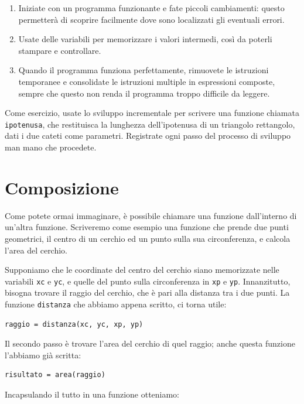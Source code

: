 \documentclass[10pt]{book}
\begin{document}
\begin{enumerate}

\item Iniziate con un programma funzionante e fate piccoli cambiamenti:
       questo permetterà di scoprire facilmente dove sono localizzati
       gli eventuali errori.

\item Usate delle variabili per memorizzare i valori intermedi, così
       da poterli stampare e controllare.

\item Quando il programma funziona perfettamente, rimuovete le istruzioni        temporanee e consolidate le istruzioni multiple in espressioni composte, sempre che questo non renda il programma troppo difficile da leggere.

\end{enumerate}


Come esercizio, usate lo sviluppo incrementale per scrivere una funzione
chiamata {\tt ipotenusa}, che restituisca la lunghezza dell'ipotenusa di un
triangolo rettangolo, dati i due cateti come parametri.
Registrate ogni passo del processo di sviluppo man mano che procedete.

\section{Composizione}

Come potete ormai immaginare, è possibile chiamare una funzione dall'interno di un'altra funzione. Scriveremo come esempio una funzione che prende due punti geometrici, il centro di un cerchio ed un punto sulla sua circonferenza, e calcola l'area del cerchio.

Supponiamo che le coordinate del centro del cerchio siano memorizzate nelle variabili {\tt xc} e {\tt yc}, e quelle del punto sulla circonferenza in {\tt xp} e {\tt yp}. Innanzitutto, bisogna trovare il raggio del cerchio, che è pari alla distanza tra i due punti. La funzione {\tt distanza} che abbiamo appena scritto, ci torna utile:

\begin{verbatim}
raggio = distanza(xc, yc, xp, yp)
\end{verbatim}
%
Il secondo passo è trovare l'area del cerchio di quel raggio; anche questa funzione l'abbiamo già scritta:

\begin{verbatim}
risultato = area(raggio)
\end{verbatim}
%
Incapsulando il tutto in una funzione otteniamo:
\end{document}
